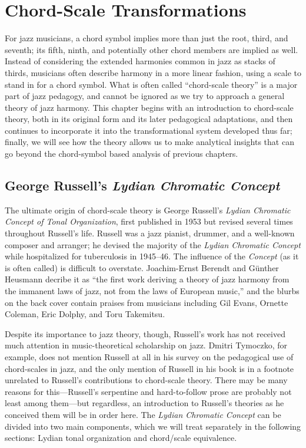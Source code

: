 
\chapter{Chord-Scale Transformations}
\label{chap:chord-scale-transformations}
\addtocspace


For jazz musicians, a chord symbol implies more than just the root, third, and
seventh; its fifth, ninth, and potentially other chord members are implied as
well. Instead of considering the extended harmonies common in jazz as stacks
of thirds, musicians often describe harmony in a more linear fashion, using a
scale to stand in for a chord symbol. What is often called ``chord-scale
theory'' is a major part of jazz pedagogy, and cannot be ignored as we try to
approach a general theory of jazz harmony. This chapter begins with an
introduction to chord-scale theory, both in its original form and its later
pedagogical adaptations, and then continues to incorporate it into the
transformational system developed thus far; finally, we will see how the
theory allows us to make analytical insights that can go beyond the
chord-symbol based analysis of previous chapters.

\section{George Russell’s \emph{Lydian Chromatic Concept}}
\label{sec:lcc}

The ultimate origin of chord-scale theory is George Russell's \emph{Lydian
  Chromatic Concept of Tonal Organization}, first published in 1953 but
revised several times throughout Russell's life. Russell was a jazz
pianist, drummer, and a well-known composer and arranger; he devised the
majority of the \emph{Lydian Chromatic Concept} while hospitalized for
tuberculosis in 1945--46. The influence of the \emph{Concept} (as it
is often called) is difficult to overstate. Joachim-Ernst Berendt and Günther
Heusmann decribe it as ``the first work deriving a theory of jazz harmony from
the immanent laws of jazz, not from the laws of European music,'' and the
blurbs on the back cover contain praises from musicians including Gil Evans,
Ornette Coleman, Eric Dolphy, and Toru Takemitsu.

Despite its importance to jazz theory, though, Russell's work has not received
much attention in music-theoretical scholarship on jazz. Dmitri Tymoczko, for
example, does not mention Russell at all in his survey on the pedagogical use
of chord-scales in jazz, and the only mention of Russell in his book is in a
footnote unrelated to Russell's contributions to chord-scale theory.
There may be many reasons for this---Russell's serpentine and hard-to-follow
prose are probably not least among them---but regardless, an introduction
to Russell's theories as he conceived them will be in order here. The
\emph{Lydian Chromatic Concept} can be divided into two main components, which
we will treat separately in the following sections: Lydian tonal organization and
chord/scale equivalence.

